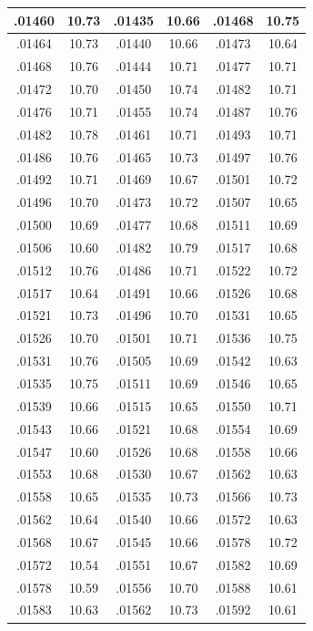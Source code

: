 \documentclass[11pt]{report}
\begin{document}
\begin{appendices}
\begin{longtable}{|c|c||c|c||c|c|}
.01460 & 10.73 & .01435 & 10.66 & .01468 & 10.75\\\hline
.01464 & 10.73 & .01440 & 10.66 & .01473 & 10.64\\\hline
.01468 & 10.76 & .01444 & 10.71 & .01477 & 10.71\\\hline
.01472 & 10.70 & .01450 & 10.74 & .01482 & 10.71\\\hline
.01476 & 10.71 & .01455 & 10.74 & .01487 & 10.76\\\hline
.01482 & 10.78 & .01461 & 10.71 & .01493 & 10.71\\\hline
.01486 & 10.76 & .01465 & 10.73 & .01497 & 10.76\\\hline
.01492 & 10.71 & .01469 & 10.67 & .01501 & 10.72\\\hline
.01496 & 10.70 & .01473 & 10.72 & .01507 & 10.65\\\hline
.01500 & 10.69 & .01477 & 10.68 & .01511 & 10.69\\\hline
.01506 & 10.60 & .01482 & 10.79 & .01517 & 10.68\\\hline
.01512 & 10.76 & .01486 & 10.71 & .01522 & 10.72\\\hline
.01517 & 10.64 & .01491 & 10.66 & .01526 & 10.68\\\hline
.01521 & 10.73 & .01496 & 10.70 & .01531 & 10.65\\\hline
.01526 & 10.70 & .01501 & 10.71 & .01536 & 10.75\\\hline
.01531 & 10.76 & .01505 & 10.69 & .01542 & 10.63\\\hline
.01535 & 10.75 & .01511 & 10.69 & .01546 & 10.65\\\hline
.01539 & 10.66 & .01515 & 10.65 & .01550 & 10.71\\\hline
.01543 & 10.66 & .01521 & 10.68 & .01554 & 10.69\\\hline
.01547 & 10.60 & .01526 & 10.68 & .01558 & 10.66\\\hline
.01553 & 10.68 & .01530 & 10.67 & .01562 & 10.63\\\hline
.01558 & 10.65 & .01535 & 10.73 & .01566 & 10.73\\\hline
.01562 & 10.64 & .01540 & 10.66 & .01572 & 10.63\\\hline
.01568 & 10.67 & .01545 & 10.66 & .01578 & 10.72\\\hline
.01572 & 10.54 & .01551 & 10.67 & .01582 & 10.69\\\hline
.01578 & 10.59 & .01556 & 10.70 & .01588 & 10.61\\\hline
.01583 & 10.63 & .01562 & 10.73 & .01592 & 10.61\\\hline

\end{longtable}
\end{appendices}
\end{document}
